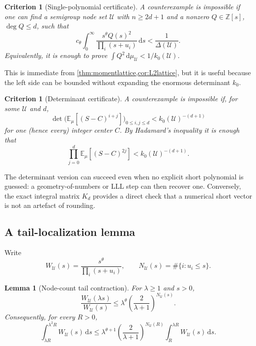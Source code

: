 \documentclass[11pt]{article}
\newtheorem{lemma}[theorem]{Lemma}
\newtheorem{criterion}[theorem]{Criterion}
\theoremstyle{definition}
\theoremstyle{remark}
\newcommand{\Z}{\mathbb Z}
\newcommand{\dd}{\,\mathrm d}
\newcommand{\cst}{c_{\theta}}
\newcommand{\UU}{\mathcal U}
\begin{document}
\begin{criterion}[Single-polynomial certificate]\label{crit:poly}
A counterexample is impossible if one can find a semigroup node set $\UU$ with
$n\ge2d+1$ and a nonzero $Q\in\Z[s]$, $\deg Q\le d$, such that
\begin{equation}\label{eq:polycrit}
 \cst\int_0^\infty
 \frac{s^\theta Q(s)^2}{\prod_i(s+u_i)}\dd s
 <\frac1{\Delta(\UU)}.
\end{equation}
Equivalently, it is enough to prove
$\int Q^2\dd\mu_\UU<1/k_0(\UU)$.
\end{criterion}

This is immediate from \cref{thm:momentlattice,cor:L2lattice}, but it is useful because the
left side can be bounded without expanding the enormous determinant $k_0$.

\begin{criterion}[Determinant certificate]\label{crit:det}
A counterexample is impossible if, for some $\UU$ and $d$,
\begin{equation}\label{eq:detcrit}
 \det\bigl(\mathbb E_\mu[(S-C)^{i+j}]\bigr)_{0\le i,j\le d}
 <k_0(\UU)^{-(d+1)}
\end{equation}
for one (hence every) integer center $C$.
By Hadamard's inequality it is enough that
\begin{equation}\label{eq:hadamardcrit}
 \prod_{j=0}^d\mathbb E_\mu[(S-C)^{2j}]<k_0(\UU)^{-(d+1)}.
\end{equation}
\end{criterion}

The determinant version can succeed even when no explicit short polynomial is guessed: a
geometry-of-numbers or LLL step can then recover one.  Conversely, the exact integral matrix
$K_d$ provides a direct check that a numerical short vector is not an artefact of rounding.

\subsection{A tail-localization lemma}

Write
\[
 W_\UU(s)=\frac{s^\theta}{\prod_i(s+u_i)},
 \qquad N_\UU(s)=\#\{i:u_i\le s\}.
\]

\begin{lemma}[Node-count tail contraction]\label{lem:tail}
For $\lambda\ge1$ and $s>0$,
\begin{equation}\label{eq:tailpoint}
 \frac{W_\UU(\lambda s)}{W_\UU(s)}
 \le \lambda^\theta
 \left(\frac{2}{\lambda+1}\right)^{N_\UU(s)}.
\end{equation}
Consequently, for every $R>0$,
\begin{equation}\label{eq:tailinterval}
 \int_{\lambda R}^{\lambda^2R}W_\UU(s)\dd s
 \le \lambda^{\theta+1}
 \left(\frac{2}{\lambda+1}\right)^{N_\UU(R)}
 \int_R^{\lambda R}W_\UU(s)\dd s.
\end{equation}
\end{lemma}
\end{document}
